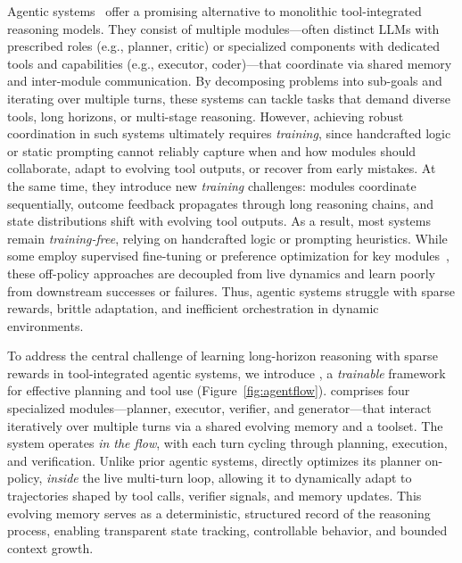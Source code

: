 Agentic systems~\citep{wu2024autogen,hong2024metagpt,hu2025owl} offer a promising alternative to monolithic tool-integrated reasoning models. They consist of multiple modules—often distinct LLMs with prescribed roles (e.g., planner, critic) or specialized components with dedicated tools and capabilities (e.g., executor, coder)—that coordinate via shared memory and inter-module communication. By decomposing problems into sub-goals and iterating over multiple turns, these systems can tackle tasks that demand diverse tools, long horizons, or multi-stage reasoning. However, achieving robust coordination in such systems ultimately requires \emph{training}, since handcrafted logic or static prompting cannot reliably capture when and how modules should collaborate, adapt to evolving tool outputs, or recover from early mistakes. At the same time, they introduce new \emph{training} challenges: modules coordinate sequentially, outcome feedback propagates through long reasoning chains, and state distributions shift with evolving tool outputs. As a result, most systems remain \emph{training-free}, relying on handcrafted logic or prompting heuristics. While some employ supervised fine-tuning or preference optimization for key modules~\citep{motwani2024malt, park2025maporl}, these off-policy approaches are decoupled from live dynamics and learn poorly from downstream successes or failures. Thus, agentic systems struggle with sparse rewards, brittle adaptation, and inefficient orchestration in dynamic environments.



To address the central challenge of learning long-horizon reasoning with sparse rewards in tool-integrated agentic systems, we introduce \model, a \emph{trainable} framework for effective planning and tool use (Figure~\ref{fig:agentflow}). \model comprises four specialized modules—planner, executor, verifier, and generator—that interact iteratively over multiple turns via a shared evolving memory and a toolset. The system operates \emph{in the flow}, with each turn cycling through planning, execution, and verification. Unlike prior agentic systems, \model directly optimizes its planner on-policy, \emph{inside} the live multi-turn loop, allowing it to dynamically adapt to trajectories shaped by tool calls, verifier signals, and memory updates. This evolving memory serves as a deterministic, structured record of the reasoning process, enabling transparent state tracking, controllable behavior, and bounded context growth.



